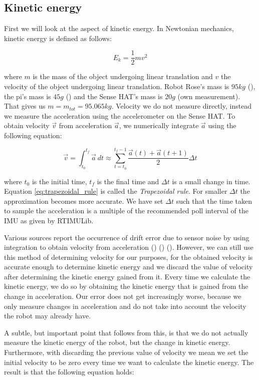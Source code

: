 \documentclass[12pt]{scrreprt}
\begin{document}
\subsection{Kinetic energy}
\label{Kinetic energy}
First we will look at the aspect of kinetic energy. In Newtonian mechanics, kinetic energy is defined as follows:

\begin{equation} \label{eq:ke}
    E_k = \frac{1}{2}mv^2
\end{equation}

where $m$ is the mass of the object undergoing linear translation and $v$ the velocity of the object undergoing linear translation. Robot Rose's mass is $95kg$ (\cite{rose_specification}), the \gls{pi}'s mass is $45g$ (\cite{raspberry_pi_weight}) and the Sense HAT's mass is $20g$ (own measurement). That gives us $m = m_{tot} = 95.065kg$. Velocity we do not measure directly, instead we measure the acceleration using the accelerometer on the Sense HAT. To obtain velocity $\vec{v}$ from acceleration $\vec{a}$, we numerically integrate $\vec{a}$ using the following equation:

\begin{equation} \label{eq:trapezoidal_rule}
    \vec{v} = \int_{t_0}^{t_f} \vec{a}\ dt \approx \sum_{t=t_0}^{t_f-1} \frac{\vec{a}(t) + \vec{a}(t+1)}{2}\Delta t
\end{equation}

where $t_0$ is the initial time, $t_f$ is the final time and $\Delta t$ is a small change in time. Equation \ref{eq:trapezoidal_rule} is called the \textit{Trapezoidal rule}. For smaller $\Delta t$ the approximation becomes more accurate. We have set $\Delta t$ such that the time taken to sample the acceleration is a multiple of the recommended poll interval of the IMU as given by RTIMULib.
\par
Various sources report the occurrence of drift error due to sensor noise by using integration to obtain velocity from acceleration (\cite{chrobotics}) (\cite{googletechtalks}) (\cite{Woodman07anintroduction_oliver}). However, we can still use this method of determining velocity for our purposes, for the obtained velocity is accurate enough to determine kinetic energy and we discard the value of velocity after determining the kinetic energy gained from it. Every time we calculate the kinetic energy, we do so by obtaining the kinetic energy that is gained from the change in acceleration. Our error does not get increasingly worse, because we only measure changes in acceleration and do not take into account the velocity the robot may already have.
\par
A subtle, but important point that follows from this, is that we do not actually measure the kinetic energy of the robot, but the change in kinetic energy. Furthermore, with discarding the previous value of velocity we mean we set the initial velocity to be zero every time we want to calculate the kinetic energy. The result is that the following equation holds:
\\\\
\end{document}
